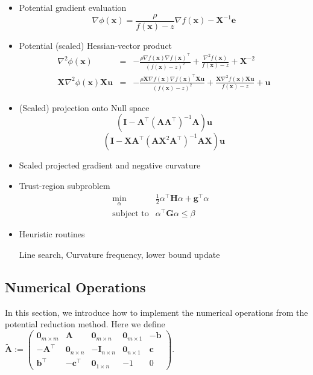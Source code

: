 \documentclass{article}
\newcommand{\assign}{:=}
\newcommand{\x}{\mathbf{x}}
\newcommand{\A}{\mathbf{A}}
\newcommand{\0}{\textbf{0}}
\newcommand{\e}{\mathbf{e}}
\newcommand{\n}{\nabla}
\newcommand{\X}{\mathbf{X}}
\newcommand{\I}{\mathbf{I}}
\newcommand{\tmH}{\mathbf{H}}
\newcommand{\g}{\mathbf{g}}
\newcommand{\G}{\mathbf{G}}
\newcommand{\tmb}{\mathbf{b}}
\newcommand{\tmc}{\mathbf{c}}
\newcommand{\tmu}{\mathbf{u}}
\begin{document}
\begin{itemize}
  \item Potential gradient evaluation
  \[ \n \phi \left( \x \right) = \frac{\rho}{f \left( \x \right) - z} \n f
     \left( \x \right) - \X^{- 1} \e \]
  \item Potential (scaled) Hessian-vector product
  \begin{eqnarray*}
    \n^2 \phi \left( \x \right) & = & - \frac{\rho \n f \left( \x \right) \n f
    \left( \x \right)^{\top}}{\left( f \left( \x \right) - z \right)^2} +
    \frac{\n^2 f \left( \x \right)}{f \left( \x \right) - z} + \X^{- 2}\\
    \X \n^2 \phi \left( \x \right) \X \tmu & = & - \frac{\rho \X \n f \left( \x
    \right) \n f \left( \x \right)^{\top} \X \tmu}{\left( f \left( \x \right)
    - z \right)^2} + \frac{\X \n^2 f \left( \x \right) \X \tmu}{f \left( \x
    \right) - z} + \tmu
  \end{eqnarray*}
  \item (Scaled) projection onto Null space
  \[ \left( \I - \A^{\top} \left( \A \A^{\top} \right)^{- 1} \A \right) \tmu
  \]
  \[ \left( \I - \X \A^{\top} \left( \A \X^2 \A^{\top} \right)^{- 1} \A \X
     \right) \tmu \]
  \item Scaled projected gradient and negative curvature
  
  \item Trust-region subproblem
  \begin{eqnarray*}
    \min_{\alpha} & \frac{1}{2} \alpha^{\top} \tmH \alpha + \g^{\top} \alpha &
    \\
    \text{subject to} & \alpha^{\top} \G \alpha \leq \beta & 
  \end{eqnarray*}
  \item Heuristic routines
  
  Line search, Curvature frequency, lower bound update
\end{itemize}

\subsection{Numerical Operations}

In this section, we introduce how to implement the numerical operations from
the potential reduction method. Here we define $\widetilde{\A} \assign
\left(\begin{array}{ccccc}
  \0_{m \times m} & \A & \0_{m \times n} & \0_{m \times 1} & - \tmb\\
  - \A^{\top} & \0_{n \times n} & - \I_{n \times n} & \0_{n \times 1} & \tmc\\
  \tmb^{\top} & - \tmc^{\top} & \0_{1 \times n} & - 1 & 0
\end{array}\right)$.
\end{document}
